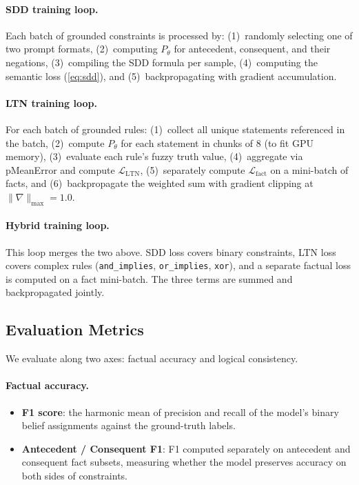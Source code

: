 \documentclass[11pt,a4paper]{article}
\newcommand{\LTNloss}{\mathcal{L}_{\text{LTN}}}
\newcommand{\Lfact}{\mathcal{L}_{\text{fact}}}
\begin{document}
\paragraph{SDD training loop.}
Each batch of grounded constraints is processed by: (1)~randomly selecting
one of two prompt formats, (2)~computing $P_\theta$ for antecedent,
consequent, and their negations, (3)~compiling the SDD formula per sample,
(4)~computing the semantic loss (\cref{eq:sdd}), and
(5)~backpropagating with gradient accumulation.

\paragraph{LTN training loop.}
For each batch of grounded rules: (1)~collect all unique statements
referenced in the batch, (2)~compute $P_\theta$ for each statement in
chunks of 8 (to fit GPU memory), (3)~evaluate each rule's fuzzy truth
value, (4)~aggregate via pMeanError and compute $\LTNloss$,
(5)~separately compute $\Lfact$ on a mini-batch of facts, and
(6)~backpropagate the weighted sum with gradient clipping at
$\|\nabla\|_{\max}{=}1.0$.

\paragraph{Hybrid training loop.}
This loop merges the two above.  SDD loss covers binary constraints, LTN
loss covers complex rules (\texttt{and\_implies}, \texttt{or\_implies},
\texttt{xor}), and a separate factual loss is computed on a fact
mini-batch.  The three terms are summed and backpropagated jointly.

\subsection{Evaluation Metrics}
\label{sec:metrics}

We evaluate along two axes: factual accuracy and logical
consistency.

\paragraph{Factual accuracy.}
\begin{itemize}[nosep]
  \item \textbf{F1 score}: the harmonic mean of precision and recall of the
    model's binary belief assignments against the ground-truth labels.
  \item \textbf{Antecedent / Consequent F1}: F1 computed separately on
    antecedent and consequent fact subsets, measuring whether the model
    preserves accuracy on both sides of constraints.
\end{itemize}
\end{document}
